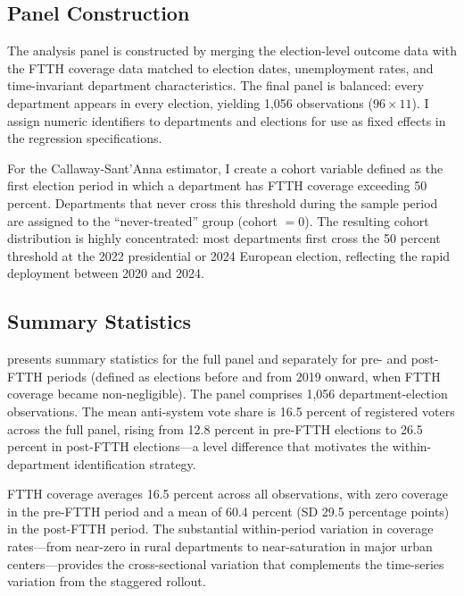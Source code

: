 \documentclass[12pt]{article}
\begin{document}
\subsection{Panel Construction}

The analysis panel is constructed by merging the election-level outcome data with the FTTH coverage data matched to election dates, unemployment rates, and time-invariant department characteristics. The final panel is balanced: every department appears in every election, yielding 1,056 observations ($96 \times 11$). I assign numeric identifiers to departments and elections for use as fixed effects in the regression specifications.

For the Callaway-Sant'Anna estimator, I create a cohort variable defined as the first election period in which a department has FTTH coverage exceeding 50 percent. Departments that never cross this threshold during the sample period are assigned to the ``never-treated'' group (cohort $= 0$). The resulting cohort distribution is highly concentrated: most departments first cross the 50 percent threshold at the 2022 presidential or 2024 European election, reflecting the rapid deployment between 2020 and 2024.

\subsection{Summary Statistics}

 presents summary statistics for the full panel and separately for pre- and post-FTTH periods (defined as elections before and from 2019 onward, when FTTH coverage became non-negligible). The panel comprises 1,056 department-election observations. The mean anti-system vote share is 16.5 percent of registered voters across the full panel, rising from 12.8 percent in pre-FTTH elections to 26.5 percent in post-FTTH elections---a level difference that motivates the within-department identification strategy.

FTTH coverage averages 16.5 percent across all observations, with zero coverage in the pre-FTTH period and a mean of 60.4 percent (SD 29.5 percentage points) in the post-FTTH period. The substantial within-period variation in coverage rates---from near-zero in rural departments to near-saturation in major urban centers---provides the cross-sectional variation that complements the time-series variation from the staggered rollout.


\end{document}
